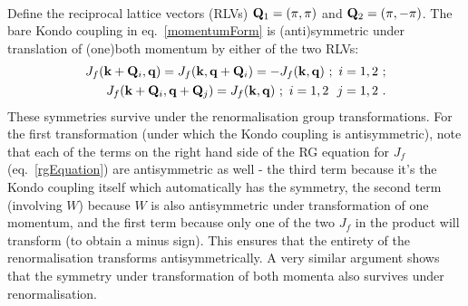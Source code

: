 \documentclass[%
reprint,
superscriptaddress,
groupedaddress,
superscriptaddress,
onecolumn,
10pt
]{revtex4-2}
\begin{document}
\par{}\\
Define the reciprocal lattice vectors (RLVs) \({\bf Q}_1 = \left(\pi, \pi\right)\) and \({\bf Q}_2 = \left(\pi, -\pi\right)\). The bare Kondo coupling in eq.~\ref{momentumForm} is (anti)symmetric under translation of (one)both momentum by either of the two RLVs:
\begin{equation}\begin{aligned}\label{oppositeQ}
	J_f({\bf k} + {\bf Q}_i, {\bf q}) = J_f({\bf k}, {\bf q} + {\bf Q}_i) = - J_f({\bf k}, {\bf q})~;~i = 1,2~;\\
	J_f({\bf k} + {\bf Q}_i, {\bf q} + {\bf Q}_j) = J_f({\bf k}, {\bf q})~;~i=1,2~~j=1,2~.\\
\end{aligned}\end{equation}
These symmetries survive under the renormalisation group transformations. For the first transformation (under which the Kondo coupling is antisymmetric), note that each of the terms on the right hand side of the RG equation for \(J_f\) (eq.~\ref{rgEquation}) are antisymmetric as well - the third term because it's the Kondo coupling itself which automatically has the symmetry, the second term (involving \(W\)) because \(W\) is also antisymmetric under transformation of one momentum, and the first term because only one of the two \(J_f\) in the product will transform (to obtain a minus sign). This ensures that the entirety of the renormalisation transforms antisymmetrically. A very similar argument shows that the symmetry under transformation of both momenta also survives under renormalisation.\\
\end{document}
